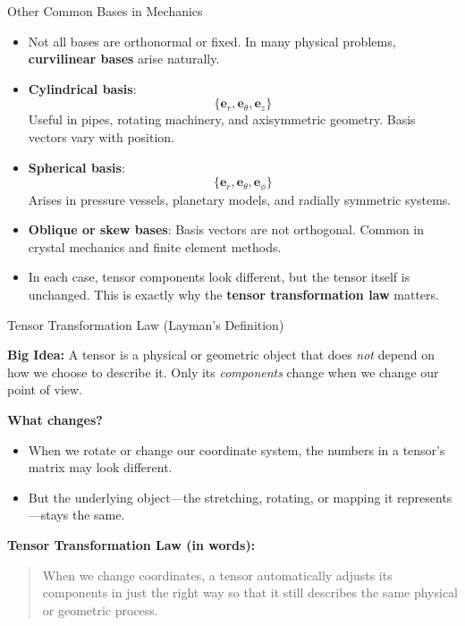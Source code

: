 \documentclass{beamer}
\begin{document}
\begin{frame}{Other Common Bases in Mechanics}

\begin{itemize}

    \item Not all bases are orthonormal or fixed.
          In many physical problems, \textbf{curvilinear bases} arise naturally.

    \item \textbf{Cylindrical basis}:
          \[
              \{\mathbf{e}_r, \mathbf{e}_\theta, \mathbf{e}_z\}
          \]
          Useful in pipes, rotating machinery, and axisymmetric geometry.
          Basis vectors vary with position.

    \item \textbf{Spherical basis}:
          \[
              \{\mathbf{e}_r, \mathbf{e}_\theta, \mathbf{e}_\phi\}
          \]
          Arises in pressure vessels, planetary models, and radially symmetric systems.

    \item \textbf{Oblique or skew bases}:
          Basis vectors are not orthogonal.
          Common in crystal mechanics and finite element methods.

    \item In each case, tensor components look different,
          but the tensor itself is unchanged.
          This is exactly why the \textbf{tensor transformation law} matters.

\end{itemize}

\end{frame}


\begin{frame}{Tensor Transformation Law (Layman’s Definition)}

\textbf{Big Idea:}  
A tensor is a physical or geometric object that does \emph{not} depend on how we choose
to describe it.  
Only its \emph{components} change when we change our point of view.

\medskip

\textbf{What changes?}  
\begin{itemize}
    \item When we rotate or change our coordinate system, the numbers in a tensor's
          matrix may look different.
    \item But the underlying object—the stretching, rotating, or mapping it represents—stays the same.
\end{itemize}

\medskip

\textbf{Tensor Transformation Law (in words):}  
\begin{quote}
When we change coordinates, a tensor automatically adjusts its components in just the
right way so that it still describes the same physical or geometric process.
\end{quote}

\end{frame}
\end{document}
